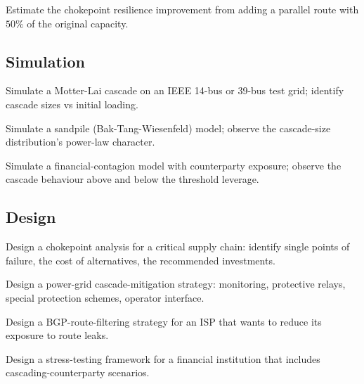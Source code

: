 \begin{exercise}
Estimate the chokepoint resilience improvement from adding a parallel route with $50\%$ of the original capacity.
\end{exercise}

\subsection*{Simulation}

\begin{exercise}
Simulate a Motter-Lai cascade on an IEEE 14-bus or 39-bus test grid; identify cascade sizes vs initial loading.
\end{exercise}

\begin{exercise}
Simulate a sandpile (Bak-Tang-Wiesenfeld) model; observe the cascade-size distribution's power-law character.
\end{exercise}

\begin{exercise}
Simulate a financial-contagion model with counterparty exposure; observe the cascade behaviour above and below the threshold leverage.
\end{exercise}

\subsection*{Design}

\begin{exercise}
Design a chokepoint analysis for a critical supply chain: identify single points of failure, the cost of alternatives, the recommended investments.
\end{exercise}

\begin{exercise}
Design a power-grid cascade-mitigation strategy: monitoring, protective relays, special protection schemes, operator interface.
\end{exercise}

\begin{exercise}
Design a BGP-route-filtering strategy for an ISP that wants to reduce its exposure to route leaks.
\end{exercise}

\begin{exercise}
Design a stress-testing framework for a financial institution that includes cascading-counterparty scenarios.
\end{exercise}

